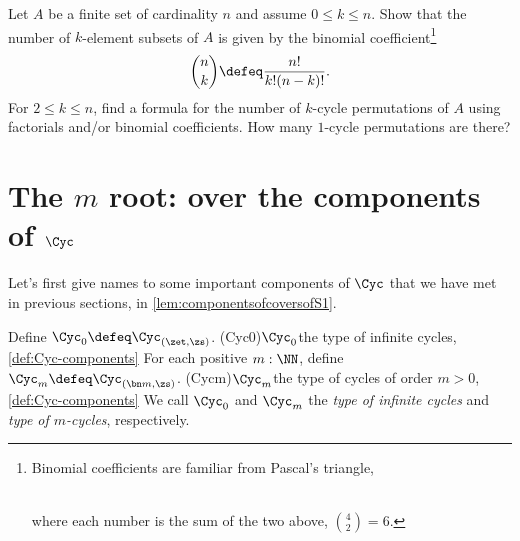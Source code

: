 \begin{xca}
  Let $A$ be a finite set of cardinality $n$ and assume $0\le k \le n$.
  Show that the number of $k$-element subsets of $A$ is given by the
  binomial coefficient\footnote{%
    Binomial coefficients are familiar from Pascal's triangle,\\
    \\
    \noindent where each number is the sum of the two above, \eg $\binom42 = 6$.}
  \[
    \binom nk \defeq \frac{n!}{k!(n-k)!}.
  \]
  For $2\le k \le n$, find a formula for the number of $k$-cycle permutations of $A$
  using factorials and/or binomial coefficients. How many $1$-cycle permutations
  are there?
\end{xca}

\section{The \texorpdfstring{$m$\th}{mᵗʰ} root:
  \coverings over the components of $\Cyc$}
  \label{sec:mthroot}

Let's first give names to some important components of $\Cyc$ that
we have met in previous sections, \eg in \cref{lem:componentsofcoversofS1}.

\begin{definition}\label{def:Cyc-components}
Define $\Cyc_0 \defeq \Cyc_{(\zet,\zs)}$.
\glossary(Cyc0){$\protect\Cyc_0$}{the type of infinite cycles,
\cref{def:Cyc-components}} 
For each positive $m:\NN$, define $\Cyc_m \defeq \Cyc_{(\bn m,\zs)}$.
\glossary(Cycm){$\protect\Cyc_m$}{the type of cycles of order $m>0$,
\cref{def:Cyc-components}} 
We call $\Cyc_0$ and $\Cyc_m$ the \emph{type of infinite cycles}
and \emph{type of $m$-cycles}, respectively.
\end{definition}


